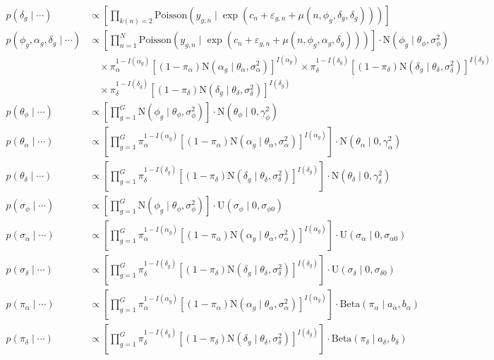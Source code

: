 \documentclass{article}\usepackage{graphicx, color}
\providecommand{\e}{\varepsilon}
\begin{document}
\begin{flushleft}
\begin{align*}
p(\delta_g \mid \cdots) &\propto \left [ \prod_{k(n) = 2} \text{Poisson}(y_{g, n} \mid \exp(c_n + \e_{g, n} + \mu(n, \phi_g, \delta_g, \delta_g))) \right ] \\
p(\phi_g, \alpha_g, \delta_g \mid \cdots) &\propto \left [ \prod_{n = 1}^N \text{Poisson}(y_{g, n} \mid \exp(c_n + \e_{g, n} + \mu(n, \phi_g, \alpha_g, \delta_g))) \right ] \cdot \text{N}(\phi_g \mid \theta_\phi, \sigma_\phi^2) \\
& \quad \times  \pi_\alpha^{1-I(\alpha_g)}[(1- \pi_\alpha)\text{N}(\alpha_g \mid \theta_\alpha, \sigma_\alpha^2)]^{I(\alpha_g)} \times  \pi_\delta^{1-I(\delta_g)}[(1- \pi_\delta)\text{N}(\delta_g \mid \theta_\delta, \sigma_\delta^2)]^{I(\delta_g)} \\
&\quad \times \pi_\delta^{1-I(\delta_g)}[(1- \pi_\delta)\text{N}(\delta_g \mid \theta_\delta, \sigma_\delta^2)]^{I(\delta_g)}\\
p(\theta_\phi \mid \cdots ) & \propto \left [ \prod_{g = 1}^G \text{N}( \phi_g \mid \theta_\phi, \sigma_\phi^2) \right ]  \cdot \text{N}(\theta_\phi \mid 0, \gamma_{\phi}^2) \\
p(\theta_\alpha \mid \cdots ) &\propto \left [ \prod_{g = 1}^G  \pi_\alpha^{1-I(\alpha_g)}[(1- \pi_\alpha)\text{N}(\alpha_g \mid \theta_\alpha, \sigma_\alpha^2)]^{I(\alpha_g)} \right ] \cdot \text{N}(\theta_\alpha \mid 0, \gamma_\alpha^2)   \\
p(\theta_\delta \mid \cdots ) &\propto \left [ \prod_{g = 1}^G  \pi_\delta^{1-I(\delta_g)}[(1- \pi_\delta)\text{N}(\delta_g \mid \theta_\delta, \sigma_\delta^2)]^{I(\delta_g)} \right ] \cdot \text{N}(\theta_\delta \mid 0, \gamma_\delta^2)   \\
p(\sigma_\phi \mid \cdots ) &\propto \left [ \prod_{g = 1}^G \text{N}( \phi_g \mid \theta_\phi, \sigma_\phi^2) \right ] \cdot \text{U}(\sigma_\phi \mid 0, \sigma_{\phi 0}) \\
p(\sigma_\alpha \mid \cdots ) &\propto \left [ \prod_{g = 1}^G  \pi_\alpha^{1-I(\alpha_g)}[(1- \pi_\alpha)\text{N}(\alpha_g \mid \theta_\alpha, \sigma_\alpha^2)]^{I(\alpha_g)} \right ]  \cdot \text{U}(\sigma_\alpha \mid 0, \sigma_{\alpha 0})    \\
p(\sigma_\delta \mid \cdots ) &\propto \left [ \prod_{g = 1}^G  \pi_\delta^{1-I(\delta_g)}[(1- \pi_\delta)\text{N}(\delta_g \mid \theta_\delta, \sigma_\delta^2)]^{I(\delta_g)} \right ]  \cdot \text{U}(\sigma_\delta \mid 0, \sigma_{\delta 0})    \\
p(\pi_\alpha \mid \cdots) &\propto \left [ \prod_{g = 1}^G  \pi_\alpha^{1-I(\alpha_g)}[(1- \pi_\alpha)\text{N}(\alpha_g \mid \theta_\alpha, \sigma_\alpha^2)]^{I(\alpha_g)} \right ] \cdot \text{Beta}(\pi_\alpha \mid a_\alpha, b_\alpha)  \\
p(\pi_\delta \mid \cdots) &\propto \left [ \prod_{g = 1}^G  \pi_\delta^{1-I(\delta_g)}[(1- \pi_\delta)\text{N}(\delta_g \mid \theta_\delta, \sigma_\delta^2)]^{I(\delta_g)} \right ] \cdot \text{Beta}(\pi_\delta \mid a_\delta, b_\delta) 
\end{align*}



\end{flushleft}
\end{document}

